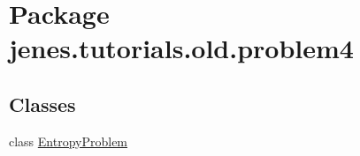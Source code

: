 \hypertarget{namespacejenes_1_1tutorials_1_1old_1_1problem4}{\section{Package jenes.\-tutorials.\-old.\-problem4}
\label{namespacejenes_1_1tutorials_1_1old_1_1problem4}
}
\subsection*{Classes}
\begin{DoxyCompactItemize}
\item 
class \hyperlink{classjenes_1_1tutorials_1_1old_1_1problem4_1_1_entropy_problem}{Entropy\-Problem}
\end{DoxyCompactItemize}
